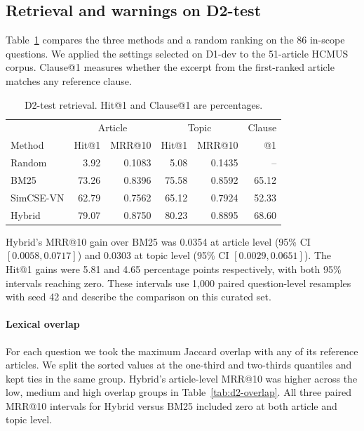 \subsection{Retrieval and warnings on D2-test}
\label{sec:d2-results}
Table~\ref{tab:d2-overall} compares the three methods and a random
ranking on the 86 in-scope questions. We applied the settings selected
on D1-dev to the 51-article HCMUS corpus. Clause@1 measures whether
the excerpt from the first-ranked article matches any reference clause.

\begin{table}[htbp]
\caption{D2-test retrieval. Hit@1 and Clause@1 are percentages.}
\label{tab:d2-overall}
\centering\footnotesize
\setlength{\tabcolsep}{3pt}
\begin{tabular}{@{}lrrrrr@{}}
\hline
& \multicolumn{2}{c}{Article} & \multicolumn{2}{c}{Topic} & Clause \\
Method & Hit@1 & MRR@10 & Hit@1 & MRR@10 & @1 \\
\hline
Random & 3.92 & 0.1083 & 5.08 & 0.1435 & -- \\
BM25 & 73.26 & 0.8396 & 75.58 & 0.8592 & 65.12 \\
SimCSE-VN & 62.79 & 0.7562 & 65.12 & 0.7924 & 52.33 \\
Hybrid & 79.07 & 0.8750 & 80.23 & 0.8895 & 68.60 \\
\hline
\end{tabular}
\end{table}

Hybrid's MRR@10 gain over BM25 was 0.0354 at article level
(95\% CI $[0.0058, 0.0717]$) and 0.0303 at topic level
(95\% CI $[0.0029, 0.0651]$). The Hit@1 gains were
5.81 and 4.65 percentage points respectively, with both
95\% intervals reaching zero. These intervals use 1,000 paired
question-level resamples with seed 42 and describe the comparison
on this curated set.

\paragraph{Lexical overlap}
For each question we took the maximum Jaccard overlap with any of its
reference articles. We split the sorted values at the one-third and
two-thirds quantiles and kept ties in the same group. Hybrid's
article-level MRR@10 was higher across the low, medium and high overlap
groups in Table~\ref{tab:d2-overlap}. All three paired MRR@10 intervals
for Hybrid versus BM25 included zero at both article and topic level.

